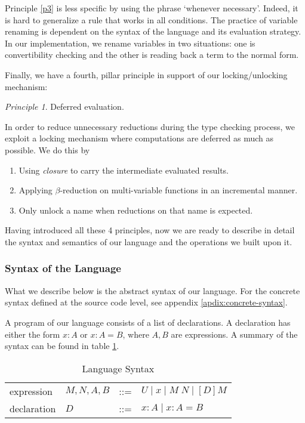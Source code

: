 \documentclass{article}
\theoremstyle{remark}
\newtheorem{principle}{Principle}
\begin{document}
Principle \ref{p3} is less specific by using the phrase `whenever necessary'. Indeed, it is hard to generalize a rule that works in all conditions. The practice of variable renaming is dependent on the syntax of the language and its evaluation strategy. In our implementation, we rename variables in two situations: one is convertibility checking and the other is reading back a term to the normal form.

Finally, we have a fourth, pillar principle in support of our locking/unlocking mechanism:
\begin{principle} \label{p4}
  Deferred evaluation.
\end{principle}

In order to reduce unnecessary reductions during the type checking process, we exploit a locking mechanism where computations are deferred as much as possible. We do this by
\begin{enumerate}
\item Using \emph{closure} to carry the intermediate evaluated results.
\item Applying $\beta$-reduction on multi-variable functions in an incremental manner.
\item Only unlock a name when reductions on that name is expected.
\end{enumerate}

Having introduced all these 4 principles, now we are ready to describe in detail the syntax and semantics of our language and the operations we built upon it.

\subsubsection{Syntax of the Language}
What we describe below is the abstract syntax of our language. For the concrete syntax defined at the source code level, see appendix \ref{apdix:concrete-syntax}.

A program of our language consists of a list of declarations. A declaration has either the form $x : A$ or $x : A = B$, where $A, B$ are expressions. A summary of the syntax can be found in table \ref{tab:syntax}.

\begin{table}[h]
  \centering
  \begin{tabular}{l l l l}
    expression & $M,N,A,B$ & ::= & $U \mid x \mid M \; N \mid [D] M $ \\
    declaration & $D$ & ::= & $x : A \mid x : A = B$
  \end{tabular}
  \caption{Language Syntax}
  \label{tab:syntax}
\end{table}
\end{document}
